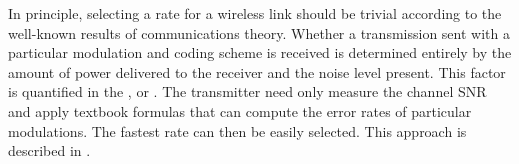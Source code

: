 In principle, selecting a rate for a wireless link should be trivial according to the well-known results of communications theory. Whether a transmission sent with a particular modulation and coding scheme is received
is determined entirely by the amount of power delivered to the receiver and the noise level present. This factor is quantified in the , or .
The transmitter need only measure the channel SNR and apply textbook formulas that can compute the error rates of particular modulations. The fastest rate can then be easily selected. This approach is described in .

